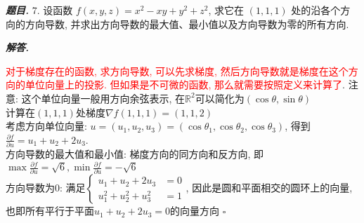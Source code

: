 \documentclass[10pt, a4paper, oneside]{ctexart}
\newenvironment{problem}{\begin{framed}\par\noindent\textbf{\textit{题目. }}}{\end{framed}\par}
\newenvironment{solution}{%
  \par\noindent\textbf{\textit{解答. }}\ignorespaces
}{%
  \hfill\ensuremath{\square}\par %
}
\begin{document}
\begin{problem}
7. 设函数 $f(x, y, z)=x^2-x y+y^2+z^2$, 求它在 $(1,1,1)$ 处的沿各个方向的方向导数, 并求出方向导数的最大值、最小值以及方向导数为零的所有方向.
\end{problem}
\begin{solution}
    \textcolor{red}{对于梯度存在的函数, 求方向导数, 可以先求梯度, 然后方向导数就是梯度在这个方向的单位向量上的投影. 但如果是不可微的函数, 那么就需要按照定义来计算了}. 注意: 这个单位向量一般用方向余弦表示, 在$\mathbb{R}^2$可以简化为$(\cos \theta,\sin \theta)$\\
    计算在$(1,1,1)$处梯度$\nabla f(1,1,1)=(1,1,2)$
    \\考虑方向单位向量: $u=(u_1,u_2,u_3)=(\cos \theta_1,\cos \theta_2,\cos \theta_3)$, 得到$\frac{\partial f}{\partial u}=u_1+u_2+2u_3$.\\
    方向导数的最大值和最小值: 梯度方向的同方向和反方向, 即$\max \frac{\partial f}{\partial u}=\sqrt{6},\min \frac{\partial f}{\partial u}=-\sqrt{6}$\\
    方向导数为$0$: 满足$\begin{cases}
        u_1+u_2+2u_3&=0\\
        u_1^2+u_2^2+u_3^2&=1
    \end{cases}$, 因此是圆和平面相交的圆环上的向量, 也即所有平行于平面$u_1+u_2+2u_3=0$的向量方向
\end{solution}
\end{document}
